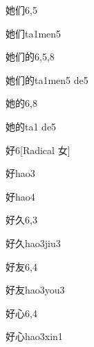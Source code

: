 \begin{entry}{她们}{6,5}
  \begin{phonetics}{她们}{ta1men5}
  \end{phonetics}
\end{entry}

\begin{entry}{她们的}{6,5,8}
  \begin{phonetics}{她们的}{ta1men5 de5}
  \end{phonetics}
\end{entry}

\begin{entry}{她的}{6,8}
  \begin{phonetics}{她的}{ta1 de5}
  \end{phonetics}
\end{entry}

\begin{entry}{好}{6}[Radical ⼥]
  \begin{phonetics}{好}{hao3}
  \end{phonetics}
  \begin{phonetics}{好}{hao4}
  \end{phonetics}
\end{entry}

\begin{entry}{好久}{6,3}
  \begin{phonetics}{好久}{hao3jiu3}
  \end{phonetics}
\end{entry}

\begin{entry}{好友}{6,4}
  \begin{phonetics}{好友}{hao3you3}
  \end{phonetics}
\end{entry}

\begin{entry}{好心}{6,4}
  \begin{phonetics}{好心}{hao3xin1}
  \end{phonetics}
\end{entry}

